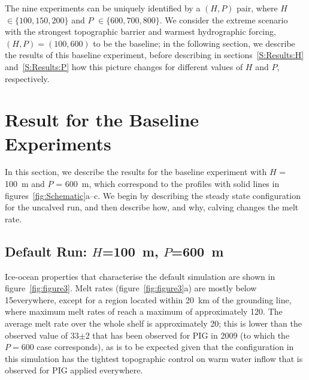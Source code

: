 \documentclass[draft]{agujournal2019}
\begin{document}
The nine experiments can be uniquely identified by a $(H,P)$ pair, where $H$ $\in \{100, 150, 200\}$ and $P$ $\in \{600, 700, 800\}$. We consider the extreme scenario with the strongest topographic barrier and warmest hydrographic forcing, $(H,P) = (100,600)$ to be the baseline; in the following section, we describe the results of this baseline experiment, before describing in sections~\ref{S:Results:H} and~\ref{S:Results:P} how this picture changes for different values of $H$ and $P$, respectively.

\section{Result for the Baseline Experiments}\label{S:Baseline}
In this section, we describe the results for the baseline experiment with $H$ = 100~m and $P$ = 600~m, which correspond to the profiles with solid lines in figures~\ref{fig:Schematic}a--c. We begin by describing the steady state configuration for the uncalved run, and then describe how, and why, calving changes the melt rate.

\subsection{Default Run: $H$=100~m, $P$=600~m}\label{S:Baseline:Default}
Ice-ocean properties that characterise the default simulation are shown in figure~\ref{fig:figure3}. Melt rates (figure~\ref{fig:figure3}a) are mostly below  15\mpryr everywhere, except for a region located within 20~km of the grounding line, where maximum melt rates of reach a maximum of approximately 120\mpryr. The average melt rate over the whole shelf is approximately 20\mpryr; this is lower than the observed value of 33$\pm$2 that has been observed for PIG in 2009 (to which the $P=600$ case corresponds), as is to be expected given that the configuration in this simulation has the tightest topographic control on warm water inflow that is observed for PIG applied everywhere.
\end{document}
